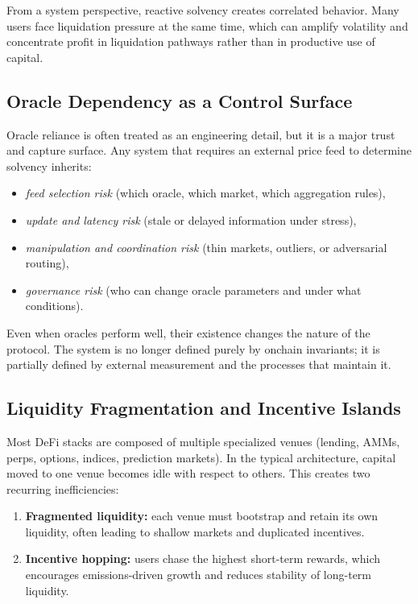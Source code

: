 \documentclass[version=preprint]{iacrcc}
\begin{document}
From a system perspective, reactive solvency creates correlated behavior. Many users face liquidation pressure at the same time, which can amplify volatility and concentrate profit in liquidation pathways rather than in productive use of capital.

\subsection{Oracle Dependency as a Control Surface}

Oracle reliance is often treated as an engineering detail, but it is a major trust and capture surface. Any system that requires an external price feed to determine solvency inherits:
\begin{itemize}
  \item \textit{feed selection risk} (which oracle, which market, which aggregation rules),
  \item \textit{update and latency risk} (stale or delayed information under stress),
  \item \textit{manipulation and coordination risk} (thin markets, outliers, or adversarial routing),
  \item \textit{governance risk} (who can change oracle parameters and under what conditions).
\end{itemize}

Even when oracles perform well, their existence changes the nature of the protocol. The system is no longer defined purely by onchain invariants; it is partially defined by external measurement and the processes that maintain it.

\subsection{Liquidity Fragmentation and Incentive Islands}

Most DeFi stacks are composed of multiple specialized venues (lending, AMMs, perps, options, indices, prediction markets). In the typical architecture, capital moved to one venue becomes idle with respect to others. This creates two recurring inefficiencies:
\begin{enumerate}
  \item \textbf{Fragmented liquidity:} each venue must bootstrap and retain its own liquidity, often leading to shallow markets and duplicated incentives.
  \item \textbf{Incentive hopping:} users chase the highest short-term rewards, which encourages emissions-driven growth and reduces stability of long-term liquidity.
\end{enumerate}
\end{document}

